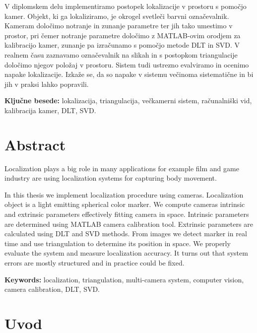 \documentclass[a4paper, 12pt]{book}
\newcommand{\tkeywords}{lokalizacija, triangulacija, večkamerni sistem, računalniški vid, kalibracija kamer, DLT, SVD}
\newcommand{\tkeywordsEn}{localization, triangulation, multi-camera system, computer vision, camera calibration, DLT, SVD}
\newcommand{\clearemptydoublepage}{\newpage{\pagestyle{empty}\cleardoublepage}}
\begin{document}
V diplomskem delu implementiramo postopek lokalizacije v prostoru s pomočjo kamer. Objekt, ki ga lokaliziramo, je okrogel svetleči barvni označevalnik. Kameram določimo notranje in zunanje parametre ter jih tako umestimo v prostor, pri čemer notranje parametre določimo z MATLAB-ovim orodjem za kalibracijo kamer, zunanje pa izračunamo s pomočjo metode DLT in SVD. V realnem času zaznavamo označevalnik na slikah in s postopkom triangulacije določimo njegov položaj v prostoru. Sistem tudi ustrezno evalviramo in ocenimo napake lokalizacije. Izkaže se, da so napake v sistemu večinoma sistematične in bi jih v praksi lahko popravili.
\bigskip

\noindent\textbf{Ključne besede:} \tkeywords.
\clearemptydoublepage

\chapter*{Abstract}
Localization plays a big role in many applications for example film and game industry are using localization systems for capturing body movement.

In this thesis we implement localization procedure using cameras. Localization object is a light emitting spherical color marker. We compute cameras intrinsic and extrinsic parameters effectively fitting camera in space. Intrinsic parameters are determined using MATLAB camera calibration tool. Extrinsic parameters are calculated using DLT and SVD methods. From images we detect marker in real time and use triangulation to determine its position in space. We properly evaluate the system and measure localization accuracy. It turns out that system errors are mostly structured and in practice could be fixed.
\bigskip

\noindent\textbf{Keywords:} \tkeywordsEn.
\clearemptydoublepage

\mainmatter
\setcounter{page}{1}
\pagestyle{fancy}

\chapter{Uvod}
\end{document}
